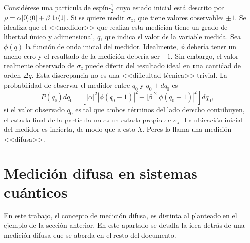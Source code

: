 Considérese una partícula de espín-$\frac{1}{2}$ cuyo estado inicial está descrito por $\rho=\alpha |0\rangle \langle0| + \beta|1\rangle \langle1|$. Si se quiere medir $\sigma_z$, que tiene valores observables $\pm 1$. Se idealiza que el <<medidor>> que realiza esta medición tiene un grado de libertad único y adimensional, $q$, que indica el valor de la variable medida. Sea $\phi(q)$ la función de onda inicial del medidor. %
Idealmente, $\phi$ debería tener un ancho cero y el resultado de la medición debería ser $\pm 1$. Sin embargo, el valor realmente observado de $\sigma_z$ puede diferir del resultado ideal en una cantidad de orden $\Delta q$. Esta discrepancia no es una <<dificultad técnica>> trivial. La probabilidad de observar el medidor entre $q_0$ y $q_0 + d q_0$ es\[P(q_0)dq_0=[|\alpha|^2|\phi(q_0-1)|^2+|\beta|^2|\phi(q_0+1)|^2]dq_0,\]si el valor observado $q_0$ es tal que ambos términos del lado derecho contribuyen, el estado final de la partícula no es un estado propio de $\sigma_z$. La ubicación inicial del medidor es incierta, de modo que  a esto A. Peres lo llama una medición <<difusa>>.   


\section{Medición difusa en sistemas cuánticos}



En este trabajo, el concepto de medición difusa,  es distinta al planteado en el ejemplo de la sección anterior.  En este apartado se detalla la idea detrás de una medición difusa que se aborda en el resto del documento.



